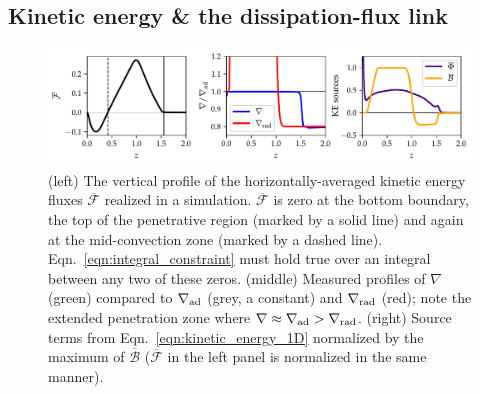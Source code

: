 \documentclass[twocolumn]{aastex631}
\newcommand{\gradrad}{\ensuremath{\nabla_{\rm{rad}}}}
\newcommand{\gradad}{\ensuremath{\nabla_{\rm{ad}}}}
\newcommand{\justgrad}{\ensuremath{\nabla}}
\renewcommand{\bar}[1]{\overline{#1}}
\begin{document}
\subsection{Kinetic energy \& the dissipation-flux link}
\label{sec:theory_energy}
\begin{figure}[t!]
\centering
\includegraphics[width=\textwidth]{theory_profiles.pdf}
\caption{
(left) The vertical profile of the horizontally-averaged kinetic energy fluxes $\bar{\mathcal{F}}$ realized in a simulation. 
$\bar{\mathcal{F}}$ is zero at the bottom boundary, the top of the penetrative region (marked by a solid line) and again at the mid-convection zone (marked by a dashed line).
Eqn.~\ref{eqn:integral_constraint} must hold true over an integral between any two of these zeros.
(middle) Measured profiles of $\justgrad$ (green) compared to $\gradad$ (grey, a constant) and $\gradrad$ (red); note the extended penetration zone where $\justgrad \approx \gradad > \gradrad$.
(right) Source terms from Eqn.~\ref{eqn:kinetic_energy_1D} normalized by the maximum of $\overline{\mathcal{B}}$ ($\bar{\mathcal{F}}$ in the left panel is normalized in the same manner).
\label{fig:theory_profiles}
}
\end{figure}
\end{document}
